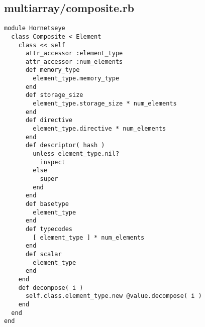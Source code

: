 \subsection{multiarray/composite.rb}\label{cha:multiarray-composite-rb}
\begin{lstlisting}
module Hornetseye
  class Composite < Element
    class << self
      attr_accessor :element_type
      attr_accessor :num_elements
      def memory_type
        element_type.memory_type
      end
      def storage_size
        element_type.storage_size * num_elements
      end
      def directive
        element_type.directive * num_elements
      end
      def descriptor( hash )
        unless element_type.nil?
          inspect
        else
          super
        end
      end
      def basetype
        element_type
      end
      def typecodes
        [ element_type ] * num_elements
      end
      def scalar
        element_type
      end
    end
    def decompose( i )
      self.class.element_type.new @value.decompose( i )
    end
  end
end
\end{lstlisting}
